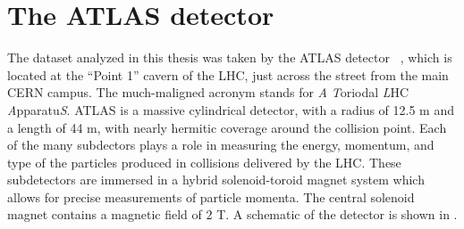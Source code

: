 

\chapter[The ATLAS detector][Top of Page Title]{The ATLAS detector} \label{Chapter-ATLAS}

The dataset analyzed in this thesis was taken by the ATLAS detector ~\cite{PERF-2007-01}, which is located at the ``Point 1'' cavern of the LHC, just across the street from the main CERN campus.
The much-maligned acronym stands for \textit{A} \textit{T}oriodal \textit{L}HC \textit{A}pparatu\textit{S}.
ATLAS is a massive cylindrical detector, with a radius of 12.5 m and a length of 44 m, with nearly hermitic coverage around the collision point.
Each of the many subdectors plays a role in  measuring the energy, momentum, and type of the particles produced in collisions delivered by the LHC.
These subdetectors are immersed in a hybrid solenoid-toroid magnet system which allows for precise measurements of particle momenta.
The central solenoid magnet contains a magnetic field of $2$ T.
A schematic of the detector is shown in .

